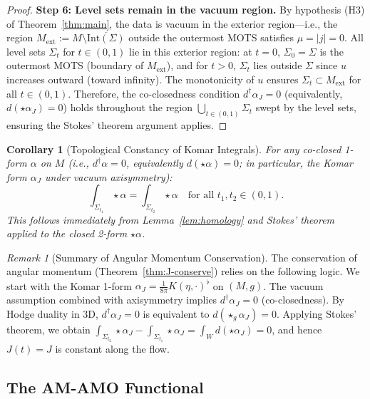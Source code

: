 \documentclass[12pt]{article}
\theoremstyle{plain}
\newtheorem{corollary}[theorem]{Corollary}
\theoremstyle{definition}
\theoremstyle{remark}
\newtheorem{remark}[theorem]{Remark}
\begin{document}
\begin{proof}
\textbf{Step 6: Level sets remain in the vacuum region.}
By hypothesis (H3) of Theorem~\ref{thm:main}, the data is vacuum in the exterior region---i.e., the region $M_{\text{ext}} := M \setminus \overline{\text{Int}(\Sigma)}$ outside the outermost MOTS satisfies $\mu = |j| = 0$. All level sets $\Sigma_t$ for $t \in (0, 1)$ lie in this exterior region: at $t = 0$, $\Sigma_0 = \Sigma$ is the outermost MOTS (boundary of $M_{\text{ext}}$), and for $t > 0$, $\Sigma_t$ lies outside $\Sigma$ since $u$ increases outward (toward infinity). The monotonicity of $u$ ensures $\Sigma_t \subset M_{\text{ext}}$ for all $t \in (0, 1)$. Therefore, the co-closedness condition $d^\dagger\alpha_J = 0$ (equivalently, $d(\star\alpha_J) = 0$) holds throughout the region $\bigcup_{t \in (0,1)} \Sigma_t$ swept by the level sets, ensuring the Stokes' theorem argument applies.
\end{proof}

\begin{corollary}[Topological Constancy of Komar Integrals]
For any co-closed 1-form $\alpha$ on $M$ (i.e., $d^\dagger\alpha = 0$, equivalently $d(\star\alpha) = 0$; in particular, the Komar form $\alpha_J$ under vacuum axisymmetry):
\[
\int_{\Sigma_{t_1}} \star\alpha = \int_{\Sigma_{t_2}} \star\alpha \quad \text{for all } t_1, t_2 \in (0, 1).
\]
This follows immediately from Lemma~\ref{lem:homology} and Stokes' theorem applied to the closed 2-form $\star\alpha$.
\end{corollary}

\begin{remark}[Summary of Angular Momentum Conservation]\label{rem:J-conserve-summary}
The conservation of angular momentum (Theorem~\ref{thm:J-conserve}) relies on the following logic. We start with the Komar 1-form $\alpha_J = \frac{1}{8\pi}K(\eta, \cdot)^\flat$ on $(M, g)$. The vacuum assumption combined with axisymmetry implies $d^\dagger\alpha_J = 0$ (co-closedness). By Hodge duality in 3D, $d^\dagger\alpha_J = 0$ is equivalent to $d(\star_g\alpha_J) = 0$. Applying Stokes' theorem, we obtain $\int_{\Sigma_{t_2}}\star\alpha_J - \int_{\Sigma_{t_1}}\star\alpha_J = \int_W d(\star\alpha_J) = 0$, and hence $J(t) = J$ is constant along the flow.
\end{remark}

\subsection{The AM-AMO Functional}
\end{document}
